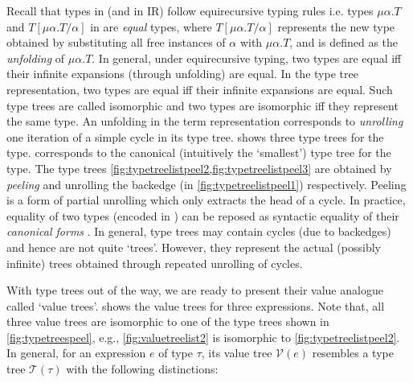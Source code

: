 Recall that types in \SpecL{} (and in IR) follow equirecursive typing rules i.e. types
$\mu \alpha. T$ and $T[\mu \alpha. T/\alpha]$ in \typegrammar{} are {\em equal} types,
where $T[\mu \alpha. T/\alpha]$ represents the new type obtained by substituting all free
instances of $\alpha$ with $\mu \alpha. T$, and is defined as the {\em unfolding} of $\mu \alpha. T$.
In general, under equirecursive typing, two types are equal iff their infinite expansions (through unfolding) are equal.
In the type tree representation, two types are equal iff their infinite expansions are equal.
Such type trees are called isomorphic and two types are isomorphic iff they represent the same type.
An unfolding in the term representation corresponds to {\em unrolling} one iteration of a simple cycle in its type tree.
 shows three type trees for the  type.
 corresponds to the canonical (intuitively the `smallest') type tree for the  type.
The type trees \cref{fig:typetreelistpeel2,fig:typetreelistpeel3} are obtained by {\em peeling} and unrolling
the backedge  (in \cref{fig:typetreelistpeel1}) respectively.
Peeling is a form of partial unrolling which only extracts the head of a cycle.
In practice, equality of two types (encoded in \typegrammar{}) can be reposed as syntactic
equality of their {\em canonical forms} \cite{canonicalrecursivetypes}.
In general, type trees may contain cycles (due to backedges) and hence are not quite `trees'.
However, they represent the actual (possibly infinite) trees obtained through repeated unrolling of cycles.


With type trees out of the way, we are ready to present their value analogue called `value trees'.
 shows the value trees for three  expressions.
Note that, all three value trees are isomorphic to one of the
 type trees shown in \cref{fig:typetreespeel}, e.g.,
\cref{fig:valuetreelist2} is isomorphic to \cref{fig:typetreelistpeel2}.
In general, for an expression $e$ of type $\tau$, its value tree $\mathcal{V}(e)$ resembles
a type tree $\mathcal{T}(\tau)$ with the following distinctions:

